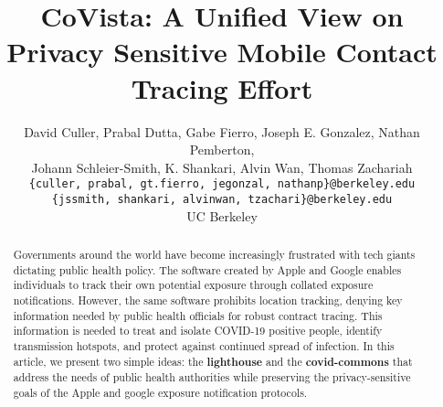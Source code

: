 \documentclass[11pt]{article}
\title{CoVista: A Unified View on Privacy Sensitive Mobile Contact Tracing Effort}
\author{David Culler, Prabal Dutta, Gabe Fierro, Joseph E. Gonzalez, Nathan Pemberton, \\
Johann Schleier-Smith, K. Shankari, Alvin Wan, Thomas Zachariah \\
{\small \texttt{\{culler, prabal, gt.fierro, jegonzal, nathanp\}@berkeley.edu}}\\
{\small \texttt{\{jssmith, shankari, alvinwan, tzachari\}@berkeley.edu}}\\
UC Berkeley
}
\begin{document}
\maketitle

\begin{abstract}
Governments around the world have become increasingly frustrated with tech giants dictating public health policy. The software created by Apple and Google enables individuals to track their own potential exposure through collated exposure notifications. However, the same software prohibits location tracking, denying key information needed by public health officials for robust contract tracing. This information is needed to treat and isolate COVID-19 positive people, identify transmission hotspots, and protect against continued spread of infection.
In this article, we present two simple ideas: the \textbf{lighthouse} and the \textbf{covid-commons} that address the needs of public health authorities while preserving the privacy-sensitive goals of the Apple and google exposure notification protocols. 
\end{abstract}













% 
% 
% 
\end{document}
